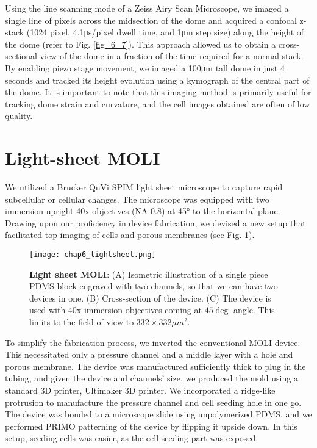 Using the line scanning mode of a Zeiss Airy Scan Microscope, we imaged a single line of pixels across the midsection of the dome and acquired a confocal z-stack (1024 pixel, 4.1\unit{\us/pixel} dwell time, and 1\unit{\um} step size) along the height of the dome (refer to Fig. \ref{fig_6_7}). This approach allowed us to obtain a cross-sectional view of the dome in a fraction of the time required for a normal stack. By enabling piezo stage movement, we imaged a 100\unit{\um} tall dome in just 4 seconds and tracked its height evolution using a kymograph of the central part of the dome. It is important to note that this imaging method is primarily useful for tracking dome strain and curvature, and the cell images obtained are often of low quality.


\hypertarget{light-sheet-moli}{%
\section{Light-sheet MOLI}\label{light-sheet-moli}}

We utilized a Brucker QuVi SPIM light sheet microscope to capture rapid subcellular or cellular changes. The microscope was equipped with two immersion-upright 40x objectives (NA 0.8) at 45\unit{\degree} to the horizontal plane. Drawing upon our proficiency in device fabrication, we devised a new setup that facilitated top imaging of cells and porous membranes (see Fig. \ref{fig_6_8}).

\begin{figure}[h!]
	\centering
	\texttt{[image: chap6\_lightsheet.png]}
	\caption{ \textbf{Light sheet MOLI}: (A) Isometric illustration of a single piece PDMS block engraved with two channels, so that we can have two devices in one. (B) Cross-section of the device. (C) The device is used with 40x immersion objectives coming at $45 \deg$ angle. This limits to the field of view to $332\times 332\mu m^2$.
	}\label{fig_6_8}
\end{figure}

To simplify the fabrication process, we inverted the conventional MOLI device. This necessitated only a pressure channel and a middle layer with a hole and porous membrane. The device was manufactured sufficiently thick to plug in the tubing, and given the device and channels' size, we produced the mold using a standard 3D printer, Ultimaker 3D printer. We incorporated a ridge-like protrusion to manufacture the pressure channel and cell seeding hole in one go. The device was bonded to a microscope slide using unpolymerized PDMS, and we performed PRIMO patterning of the device by flipping it upside down. In this setup, seeding cells was easier, as the cell seeding part was exposed.

